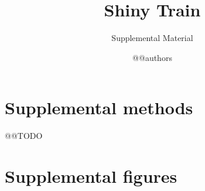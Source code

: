 \documentclass[a4paper,11pt,abstracton,hidelinks]{scrartcl}
\title{
Shiny Train
}
\subtitle{\large{Supplemental Material}}
\author{@@authors}
\begin{document}
\maketitle

\beginsupplement

\clearpage


\section*{Supplemental methods}

@@TODO


\clearpage


\section*{Supplemental figures}
\end{document}

